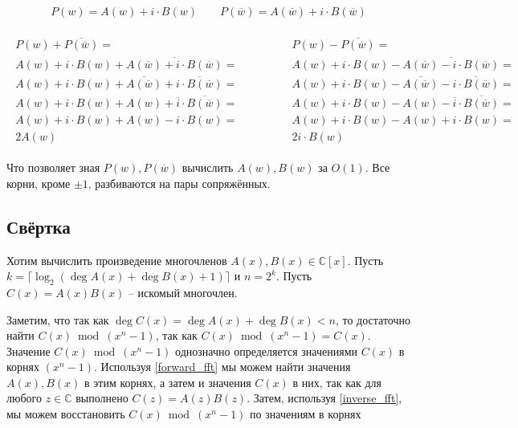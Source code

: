 \begin{gather}
    P(w) = A(w) + i \cdot B(w) \qquad P(\overline{w}) = A(\overline{w}) + i \cdot B(\overline{w})
\end{gather}

\begin{gather}
    \begin{split}
        P(w) + \overline{P(\overline{w})} =
        \\
        A(w) + i\cdot B(w) + \overline{A(\overline{w}) + i \cdot B(\overline{w})} =
        \\
        A(w) + i\cdot B(w) + \overline{A(\overline{w})} + \overline{i \cdot B(\overline{w})} =
        \\
        A(w) + i\cdot B(w) + A(w) + \overline{i} \cdot \overline{B(\overline{w})} =
        \\
        A(w) + i\cdot B(w) + A(w) - i \cdot B(w) =
        \\
        2A(w)
    \end{split}
    \qquad \qquad
    \begin{split}
        P(w) - \overline{P(\overline{w})} =
        \\
        A(w) + i\cdot B(w) - \overline{A(\overline{w}) - i \cdot B(\overline{w})} =
        \\
        A(w) + i\cdot B(w) - \overline{A(\overline{w})} - \overline{i \cdot B(\overline{w})} =
        \\
        A(w) + i\cdot B(w) - A(w) - \overline{i} \cdot \overline{B(\overline{w})} =
        \\
        A(w) + i\cdot B(w) - A(w) + i \cdot B(w) =
        \\
        2i \cdot B(w)
    \end{split}
\end{gather}


Что позволяет зная $P(w), P(\overline{w})$ вычислить $A(w), B(w)$ за $O(1)$.
Все корни, кроме $\pm 1$, разбиваются на пары сопряжённых.


\subsection{Свёртка}

Хотим вычислить произведение многочленов $A(x), B(x) \in \mathbb{C}[x]$.
Пусть $k = \big\lceil \log_2 \left( \deg A(x) + \deg B(x) + 1 \right) \big\rceil$ и $n = 2^k$.
Пусть $C(x) = A(x)B(x)$ -- искомый многочлен.

Заметим, что так как $\deg C(x) = \deg A(x) + \deg B(x) < n$, то достаточно найти $C(x) \bmod (x^n - 1)$, так как $C(x) \bmod (x^n - 1) = C(x)$.
Значение $C(x) \bmod (x^n - 1)$ однозначно определяется значениями $C(x)$ в корнях $(x^n - 1)$.
Используя \ref{forward_fft} мы можем найти значения $A(x), B(x)$ в этим корнях, а затем и значения $C(x)$ в них, так как для любого $z \in \mathbb{C}$ выполнено $C(z) = A(z)B(z)$.
Затем, используя \ref{inverse_fft}, мы можем восстановить $C(x) \bmod (x^n - 1)$ по значениям в корнях



